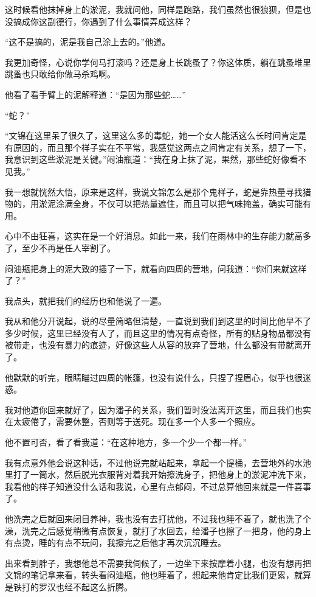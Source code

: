 这时候看他抹掉身上的淤泥，我就问他，同样是跑路，我们虽然也很狼狈，但是也没搞成你这副德行，你遇到了什么事情弄成这样？

“这不是搞的，泥是我自己涂上去的。”他道。

我更加奇怪，心说你学何马打滚吗？还是身上长跳蚤了？你这体质，躺在跳蚤堆里跳蚤也只敢给你做马杀鸡啊。

他看了看手臂上的泥解释道：“是因为那些蛇……”

“蛇？”

“文锦在这里呆了很久了，这里这么多的毒蛇，她一个女人能活这么长时间肯定是有原因的，而且那个样子实在不平常，我感觉这两点之间肯定有关系，想了一下，我意识到这些淤泥是关键。”闷油瓶道：“我在身上抹了泥，果然，那些蛇好像看不见我。”

我一想就恍然大悟，原来是这样，我说文锦怎么是那个鬼样子，蛇是靠热量寻找猎物的，用淤泥涂满全身，不仅可以把热量遮住，而且可以把气味掩盖，确实可能有用。

心中不由狂喜，这实在是一个好消息。如此一来，我们在雨林中的生存能力就高多了，至少不再是任人宰割了。

闷油瓶把身上的泥大致的插了一下，就看向四周的营地，问我道：“你们来就这样了？”

我点头，就把我们的经历也和他说了一遍。

我从和他分开说起，说的尽量简略但清楚，一直说到我们到这里的时间比他早不了多少时候，这里已经没有人了，而且这里的情况有点奇怪，所有的贴身物品都没有被带走，也没有暴力的痕迹，好像这些人从容的放弃了营地，什么都没有带就离开了。

他默默的听完，眼睛瞄过四周的帐篷，也没有说什么，只捏了捏眉心，似乎也很迷惑。

我对他道你回来就好了，因为潘子的关系，我们暂时没法离开这里，而且我们也实在太疲倦了，需要休整，否则等于送死。现在多一个人多一个照应。

他不置可否，看了看我道：“在这种地方，多一个少一个都一样。”

我有点意外他会说这种话，不过他说完就站起来，拿起一个提桶，去营地外的水池里打了一筒水，然后脱光衣服背对着我开始擦洗身子，把他身上的淤泥冲洗下来，我看他的样子知道没什么话和我说，心里有点郁闷，不过总算他回来就是一件喜事了。

他洗完之后就回来闭目养神，我也没有去打扰他，不过我也睡不着了，就也洗了个澡，洗完之后感觉稍微有点恢复，就打了水回去，给潘子也擦了一把身，他的身上有点烫，睡的有点不玩问，我擦完之后他才再次沉沉睡去。

出来看到胖子，我想他总不需要我伺候了，一边坐下来按摩着小腿，也没有想再把文锦的笔记拿来看，转头看闷油瓶，他也睡着了，想起来他肯定比我们更累，就算是铁打的罗汉也经不起这么折腾。

